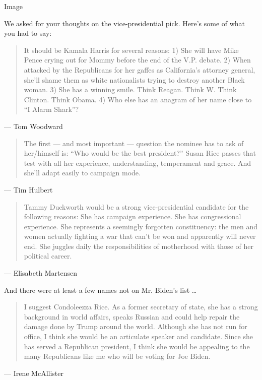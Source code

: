 Image

We asked for your thoughts on the vice-presidential pick. Here's some of
what you had to say:

\begin{quote}
It should be Kamala Harris for several reasons: 1) She will have Mike
Pence crying out for Mommy before the end of the V.P. debate. 2) When
attacked by the Republicans for her gaffes as California's attorney
general, she'll shame them as white nationalists trying to destroy
another Black woman. 3) She has a winning smile. Think Reagan. Think W.
Think Clinton. Think Obama. 4) Who else has an anagram of her name close
to ``I Alarm Shark''?
\end{quote}

--- Tom Woodward

\begin{quote}
The first --- and most important --- question the nominee has to ask of
her/himself is: ``Who would be the best president?'' Susan Rice passes
that test with all her experience, understanding, temperament and grace.
And she'll adapt easily to campaign mode.
\end{quote}

--- Tim Hulbert

\begin{quote}
Tammy Duckworth would be a strong vice-presidential candidate for the
following reasons: She has campaign experience. She has congressional
experience. She represents a seemingly forgotten constituency: the men
and women actually fighting a war that can't be won and apparently will
never end. She juggles daily the responsibilities of motherhood with
those of her political career.
\end{quote}

--- Elisabeth Martensen

And there were at least a few names not on Mr. Biden's list \ldots{}

\begin{quote}
I suggest Condoleezza Rice. As a former secretary of state, she has a
strong background in world affairs, speaks Russian and could help repair
the damage done by Trump around the world. Although she has not run for
office, I think she would be an articulate speaker and candidate. Since
she has served a Republican president, I think she would be appealing to
the many Republicans like me who will be voting for Joe Biden.
\end{quote}

--- Irene McAllister

